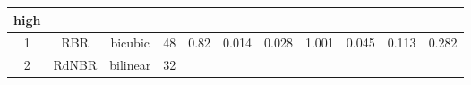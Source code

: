 \documentclass[twoside,12pt,final]{ucthesis-CA2012}
\begin{document}
\begin{ucmainmatter}
\begin{longtable}[]{@{}ccccccccccc@{}}
\begin{minipage}[b]{0.05\columnwidth}
high\strut
\end{minipage}\tabularnewline
\midrule
\endhead
\begin{minipage}[t]{0.04\columnwidth}\centering\strut
1\strut
\end{minipage} & \begin{minipage}[t]{0.11\columnwidth}\centering\strut
RBR\strut
\end{minipage} & \begin{minipage}[t]{0.06\columnwidth}\centering\strut
bicubic\strut
\end{minipage} & \begin{minipage}[t]{0.08\columnwidth}\centering\strut
48\strut
\end{minipage} & \begin{minipage}[t]{0.08\columnwidth}\centering\strut
0.82\strut
\end{minipage} & \begin{minipage}[t]{0.07\columnwidth}\centering\strut
0.014\strut
\end{minipage} & \begin{minipage}[t]{0.07\columnwidth}\centering\strut
0.028\strut
\end{minipage} & \begin{minipage}[t]{0.07\columnwidth}\centering\strut
1.001\strut
\end{minipage} & \begin{minipage}[t]{0.05\columnwidth}\centering\strut
0.045\strut
\end{minipage} & \begin{minipage}[t]{0.05\columnwidth}\centering\strut
0.113\strut
\end{minipage} & \begin{minipage}[t]{0.05\columnwidth}\centering\strut
0.282\strut
\end{minipage}\tabularnewline
\begin{minipage}[t]{0.04\columnwidth}\centering\strut
2\strut
\end{minipage} & \begin{minipage}[t]{0.11\columnwidth}\centering\strut
RdNBR\strut
\end{minipage} & \begin{minipage}[t]{0.06\columnwidth}\centering\strut
bilinear\strut
\end{minipage} & \begin{minipage}[t]{0.08\columnwidth}\centering\strut
32\strut
\end{minipage} & \begin{minipage}[t]{0.08\columnwidth}\centering\strut

\end{minipage}
\end{longtable}
\end{ucmainmatter}
\end{document}
